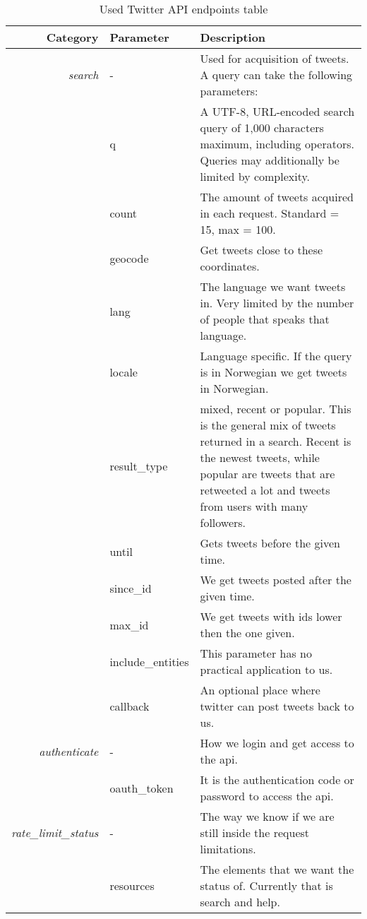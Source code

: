 \begin{table}
\centering
\label{tbl:twitterAPIendpoints}
\caption{Used Twitter API endpoints table}
\begin{tabular}{ r l | p{7cm} }
Category & Parameter & Description\\
\hline

\textit{search} & - & Used for acquisition of tweets. A query can take the
following parameters: \\
& q & A UTF-8, URL-encoded search query of 1,000 characters maximum,
including operators. Queries may additionally be limited by complexity. \\
& count & The amount of tweets acquired in each request. Standard =
15, max = 100. \\
& geocode & Get tweets close to these coordinates. \\
& lang & The language we want tweets in. Very limited by the number of people that speaks that language. \\
& locale & Language specific. If the query is in Norwegian we get tweets in Norwegian.\\
& result\_type & mixed, recent or popular. This is the general mix of tweets
returned in a search. Recent is the newest tweets, while popular are tweets that
are retweeted a lot and tweets from users with many followers. \\
& until & Gets tweets before the given time. \\
& since\_id & We get tweets posted after the given time. \\
& max\_id & We get tweets with ids lower then the one given. \\
& include\_entities & This parameter has no practical application to us. \\
& callback & An optional place where twitter can post tweets back to us. \\

\hline
\textit{authenticate} & - & How we login and get access to the api. \\
& oauth\_token & It is the authentication code or password to access
the api. \\

\hline
\textit{rate\_limit\_status} & - & The way we know if we are still inside
the request limitations. \\
& resources & The elements that we want the status of. Currently that
is search and help. \\ 

\end{tabular}
\end{table}
%

